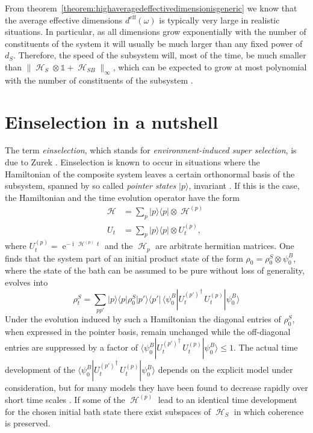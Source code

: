 \documentclass[aps,prl,twocolumn,showpacs,showkeys,a4paper]{revtex4}
\DeclareMathOperator{\ee}{\mathrm{e}}%
\DeclareMathOperator{\iu}{\mathrm{i}}%
\DeclareMathOperator{\hiH}{\mathcal{H}}%
\DeclareMathOperator{\haH}{\mathscr{H}}%
\newcommand{\bra}[1]{\langle #1|}
\newcommand{\ket}[1]{|#1\rangle}
\newcommand{\ketbra}[2]{| #1 \rangle \langle #2 |}
\begin{document}
From theorem~\ref{theorem:highaveragedeffectivedimensionisgeneric} we know that the average effective dimensions $d^{\mathrm{eff}}(\omega)$ is typically very large in realistic situations.
In particular, as all dimensions grow exponentially with the number of constituents of the system it will usually be much larger than any fixed power of $d_S$.
Therefore, the speed of the subsystem will, most of the time, be much smaller than $\| \haH_S \otimes \mathds{1} + \haH_{SB}\|_\infty$, which can be expected to grow at most polynomial with the number of constituents of the subsystem \cite{0907.1267v1}.


\section{Einselection in a nutshell}
\label{sec:einselectioninanutshell}
%
The term \emph{einselection}, which stands for \emph{environment-induced super selection}, is due to Zurek \cite{PhysRevD.26.18,RevModPhys.75.715}.
Einselection is known to occur in situations where the Hamiltonian of the composite system leaves a certain orthonormal basis of the subsystem, spanned by so called \emph{pointer states} $\ket{p}$, invariant \cite{Hornberger09}.
If this is the case, the Hamiltonian and the time evolution operator have the form
\begin{align}
  \label{eq:einselectionhamiltonian}
  \haH &= \sum_p \ketbra{p}{p} \otimes \haH^{(p)} \\
  U_t &= \sum_p \ketbra{p}{p} \otimes U^{(p)}_t ,
\end{align}
where $U^{(p)}_t = \ee^{-\iu\,\haH^{(p)}\,t}$ and the $\haH_p$ are arbitrate hermitian matrices.
One finds that the system part of an initial product state of the form $\rho_0 = \rho^S_0 \otimes \psi^B_0$, where the state of the bath can be assumed to be pure without loss of generality, evolves into
\begin{equation}
  \rho^S_t = \sum_{pp'} \ketbra{p}{p}\rho^S_0\ketbra{p'}{p'}\,\bra{\psi^B_0}{U^{(p')}_t}^\dagger\,U^{(p)}_t\ket{\psi^B_0}
\end{equation}
Under the evolution induced by such a Hamiltonian the diagonal entries of $\rho^S_0$, when expressed in the pointer basis, remain unchanged while the off-diagonal entries are suppressed by a factor of $\bra{\psi^B_0}{U^{(p')}_t}^\dagger\,U^{(p)}_t\ket{\psi^B_0} \leq 1$.
The actual time development of the $\bra{\psi^B_0}{U^{(p')}_t}^\dagger\,U^{(p)}_t\ket{\psi^B_0}$ depends on the explicit model under consideration, but for many models they have been found to decrease rapidly over short time scales \cite{Hornberger09,RevModPhys.75.715,PhysRevD.26.18}.
If some of the $\haH^{(p)}$ lead to an identical time development for the chosen initial bath state there exist subspaces of $\hiH_S$ in which coherence is preserved.
\end{document}

